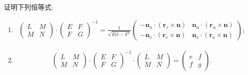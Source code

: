 \documentclass[../../main.tex]{subfiles}%
\begin{document}
\begin{example}
证明下列恒等式:
\begin{enumerate}[(1)]
\item \begin{align*}
\begin{pmatrix} L&M\\ M&N \end{pmatrix}\cdot \begin{pmatrix} E&F\\ F&G \end{pmatrix}^{-1}
=\frac{1}{\sqrt{EG-F^{2}}}\begin{pmatrix} -\bm{n}_{u}\cdot(\bm{r}_{v}\times\bm{n})&\bm{n}_{u}\cdot(\bm{r}_{u}\times\bm{n})\\ -\bm{n}_{v}\cdot(\bm{r}_{v}\times\bm{n})&\bm{n}_{v}\cdot(\bm{r}_{u}\times\bm{n}) \end{pmatrix};
\end{align*}

\item \begin{align*}
\begin{pmatrix} L&M\\ M&N \end{pmatrix}\cdot \begin{pmatrix} E&F\\ F&G \end{pmatrix}^{-1}\cdot \begin{pmatrix} L&M\\ M&N \end{pmatrix}=\begin{pmatrix} e&f\\ f&g \end{pmatrix}.
\end{align*}
\end{enumerate}
\end{example}
\end{document}
